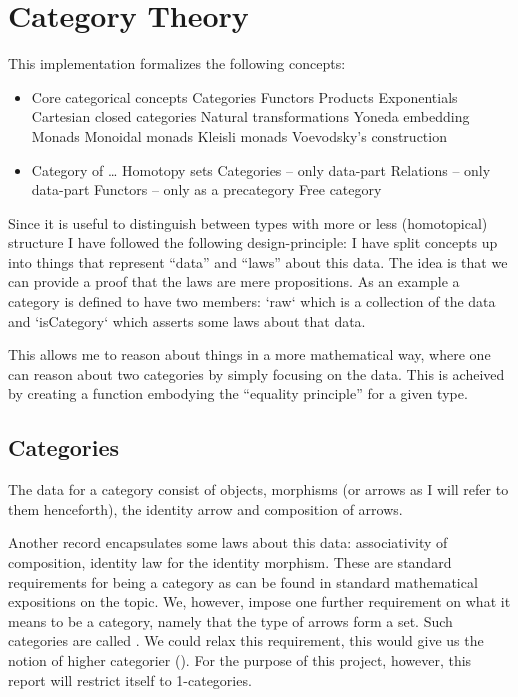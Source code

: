 \chapter{Category Theory}
\label{ch:implementation}
This implementation formalizes the following concepts:
%
\begin{itemize}
\item Core categorical concepts
\subitem Categories
\subitem Functors
\subitem Products
\subitem Exponentials
\subitem Cartesian closed categories
\subitem Natural transformations
\subitem Yoneda embedding
\subitem Monads
\subsubitem Monoidal monads
\subsubitem Kleisli monads
\subsubitem Voevodsky's construction
\item Category of \ldots
\subitem Homotopy sets
\subitem Categories -- only data-part
\subitem Relations -- only data-part
\subitem Functors -- only as a precategory
\subitem Free category
\end{itemize}
%
Since it is useful to distinguish between types with more or less (homotopical)
structure I have followed the following design-principle: I have split concepts
up into things that represent ``data'' and ``laws'' about this data. The idea is
that we can provide a proof that the laws are mere propositions. As an example a
category is defined to have two members: `raw` which is a collection of the data
and `isCategory` which asserts some laws about that data.

This allows me to reason about things in a more mathematical way, where one can
reason about two categories by simply focusing on the data. This is acheived by
creating a function embodying the ``equality principle'' for a given type.

\section{Categories}
The data for a category consist of objects, morphisms (or arrows as I will refer
to them henceforth), the identity arrow and composition of arrows.

Another record encapsulates some laws about this data: associativity of
composition, identity law for the identity morphism. These are standard
requirements for being a category as can be found in standard mathematical
expositions on the topic. We, however, impose one further requirement on what it
means to be a category, namely that the type of arrows form a set. Such
categories are called . We could relax this requirement,
this would give us the notion of higher categorier (\cite[p. 307]{hott-2013}).
For the purpose of this project, however, this report will restrict itself to
1-categories.

